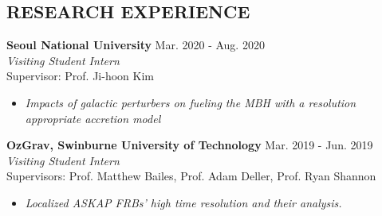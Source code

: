 \documentclass[margin, 10pt]{res} %
\begin{document}
\begin{resume}

 
\section{RESEARCH EXPERIENCE}

{\bf Seoul National University} \hfill Mar. 2020 - Aug. 2020 \\
{\sl Visiting Student Intern} \\
Supervisor: Prof. Ji-hoon Kim
\begin{itemize}
\item[] {\sl Impacts of galactic perturbers on fueling the MBH with a resolution appropriate accretion model}  %
\end{itemize} 

{\bf OzGrav, Swinburne University of Technology} \hfill Mar. 2019 - Jun. 2019 \\
{\sl Visiting Student Intern} \\
Supervisors: Prof. Matthew Bailes, Prof. Adam Deller, Prof. Ryan Shannon
\begin{itemize}
\item[] {\sl Localized ASKAP FRBs' high time resolution and their analysis.}%
\end{itemize} 


\end{resume}
\end{document}
